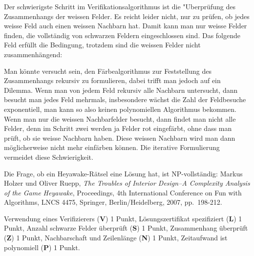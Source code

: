 \begin{diskussion}
Der schwierigste Schritt im Verifikationsalgorithmus ist die "Uberprüfung
des Zusammenhangs der weissen Felder.
Es reicht leider nicht, nur zu prüfen, ob jedes weisse Feld auch einen
weissen Nachbarn hat.
Damit kann man nur weisse Felder finden, die vollständig von schwarzen
Feldern eingeschlossen sind.
Das folgende Feld erfüllt die Bedingung, trotzdem sind die weissen
Felder nicht zusammenhängend:
\begin{center}
\end{center}

Man könnte versucht sein, den Färbealgorithmus zur Feststellung des
Zusammenhangs rekursiv zu formulieren, dabei trifft man jedoch auf ein
Dilemma.
Wenn man von jedem Feld rekursiv alle Nachbarn untersucht, dann besucht
man jedes Feld mehrmals, insbesondere wächst die Zahl der Feldbesuche
exponentiell, man kann so also keinen polynomiellen Algorithmus bekommen.
Wenn man nur die weissen Nachbarfelder besucht, dann findet man nicht
alle Felder, denn im Schritt zwei werden ja Felder rot eingefärbt, ohne 
dass man prüft, ob sie weisse Nachbarn haben.
Diese weissen Nachbarn wird man dann möglicherweise nicht mehr einfärben
können.
Die iterative Formulierung vermeidet diese Schwierigkeit.

Die Frage, ob ein Heyawake-Rätsel eine Lösung hat, ist NP-vollständig:
Markus Holzer und Oliver Ruepp, {\it The Troubles of Interior Design--A
Complexity Analysis of the Game Heyawake}, Proceedings,
4th International Conference on Fun with Algorithms, LNCS 4475, Springer,
Berlin/Heidelberg, 2007, pp.~198-212.
\end{diskussion}

\begin{bewertung}
Verwendung eines Verifizierers ({\bf V}) 1 Punkt,
Lösungszertifikat spezifiziert ({\bf L}) 1 Punkt,
Anzahl schwarze Felder überprüft ({\bf S}) 1 Punkt,
Zusammenhang überprüft ({\bf Z}) 1 Punkt,
Nachbarschaft und Zeilenlänge ({\bf N}) 1 Punkt,
Zeitaufwand ist polynomiell ({\bf P}) 1 Punkt.
\end{bewertung}

